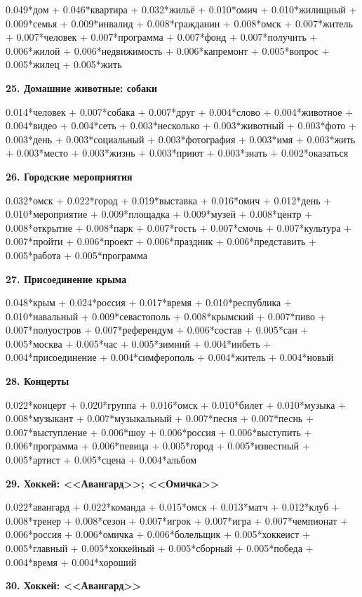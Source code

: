 0.049*дом + 0.046*квартира + 0.032*жильё + 0.010*омич + 0.010*жилищный + 0.009*семья + 0.009*инвалид + 0.008*гражданин + 0.008*омск + 0.007*житель + 0.007*человек + 0.007*программа + 0.007*фонд + 0.007*получить + 0.006*жилой + 0.006*недвижимость + 0.006*капремонт + 0.005*вопрос + 0.005*жилец + 0.005*жить

\textbf{25. Домашние животные: собаки}

0.014*человек + 0.007*собака + 0.007*друг + 0.004*слово + 0.004*животное + 0.004*видео + 0.004*сеть + 0.003*несколько + 0.003*животный + 0.003*фото + 0.003*день + 0.003*социальный + 0.003*фотография + 0.003*имя + 0.003*жить + 0.003*место + 0.003*жизнь + 0.003*приют + 0.003*знать + 0.002*оказаться

\textbf{26. Городские мероприятия}

0.032*омск + 0.022*город + 0.019*выставка + 0.016*омич + 0.012*день + 0.010*мероприятие + 0.009*площадка + 0.009*музей + 0.008*центр + 0.008*открытие + 0.008*парк + 0.007*гость + 0.007*смочь + 0.007*культура + 0.007*пройти + 0.006*проект + 0.006*праздник + 0.006*представить + 0.005*работа + 0.005*программа

\textbf{27. Присоединение крыма}

0.048*крым + 0.024*россия + 0.017*время + 0.010*республика + 0.010*навальный + 0.009*севастополь + 0.008*крымский + 0.007*пиво + 0.007*полуостров + 0.007*референдум + 0.006*состав + 0.005*сан + 0.005*москва + 0.005*час + 0.005*зимний + 0.004*инбеть + 0.004*присоединение + 0.004*симферополь + 0.004*житель + 0.004*новый

\textbf{28. Концерты}

0.022*концерт + 0.020*группа + 0.016*омск + 0.010*билет + 0.010*музыка + 0.008*музыкант + 0.007*музыкальный + 0.007*песня + 0.007*песнь + 0.007*выступление + 0.006*шоу + 0.006*россия + 0.006*выступить + 0.006*программа + 0.006*певица + 0.005*город + 0.005*известный + 0.005*артист + 0.005*сцена + 0.004*альбом

\textbf{29. Хоккей: <<Авангард>>; <<Омичка>>\footnotemark}

0.022*авангард + 0.022*команда + 0.015*омск + 0.013*матч + 0.012*клуб + 0.008*тренер + 0.008*сезон + 0.007*игрок + 0.007*игра + 0.007*чемпионат + 0.006*россия + 0.006*омичка + 0.006*болельщик + 0.005*хоккеист + 0.005*главный + 0.005*хоккейный + 0.005*сборный + 0.005*победа + 0.004*время + 0.004*хороший

\textbf{30. Хоккей: <<Авангард>>}

